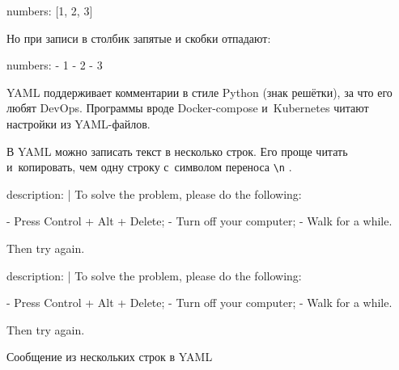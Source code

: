 
\begin{english}
  \begin{yaml}
numbers: [1, 2, 3]
  \end{yaml}
\end{english}

\noindent
Но при записи в столбик запятые и скобки отпадают:

\begin{english}
  \begin{yaml}
numbers:
  - 1
  - 2
  - 3
  \end{yaml}
\end{english}

YAML поддерживает комментарии в стиле Python (знак решётки), за что его любят
DevOps. Программы вроде Docker-compose и~Kubernetes читают настройки из
YAML-файлов.

В YAML можно записать текст в несколько строк. Его проще читать и~копировать,
чем одну строку с~символом переноса \verb|\n| .

\begin{listing}[ht!]

\ifx\devicetype\mobile

\begin{english}
  \begin{yaml}
description: |
  To solve the problem,
  please do the following:

  - Press Control + Alt + Delete;
  - Turn off your computer;
  - Walk for a while.

  Then try again.
  \end{yaml}
\end{english}

\else

\begin{english}
  \begin{yaml}
description: |
  To solve the problem, please do the following:

  - Press Control + Alt + Delete;
  - Turn off your computer;
  - Walk for a while.

  Then try again.
  \end{yaml}
\end{english}

\fi

\caption{Сообщение из нескольких строк в YAML}
\label{fig:yaml-multi-line}

\end{listing}

